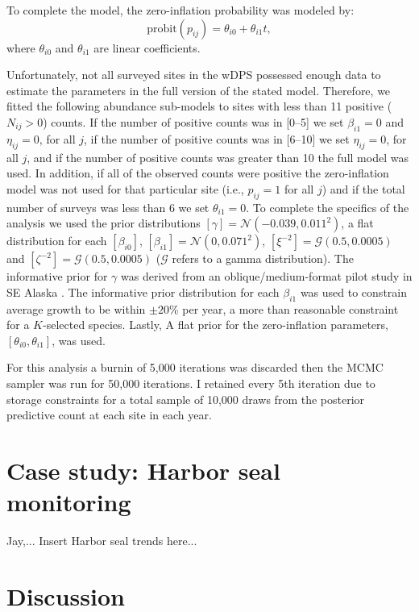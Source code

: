\documentclass[12pt,letter,draft]{article}
\newcommand{\Nij}{\ensuremath{N_{ij}}}
\begin{document}
To complete the model, the zero-inflation probability was modeled by:
\begin{equation}
\mbox{probit}(p_{ij}) = \theta_{i0} + \theta_{i1}t ,
\end{equation}
where $\theta_{i0}$ and $\theta_{i1}$ are linear coefficients. 

Unfortunately, not all surveyed sites in the wDPS possessed enough data to estimate the parameters in the full version of the stated model. Therefore, we fitted the following abundance sub-models to sites with less than 11 positive ($\Nij>0$) counts. If the number of positive counts was in [0--5] we set $\beta_{i1}=0$ and $\eta_{ij}=0$, for all $j$, if the number of positive counts was in [6--10] we set $\eta_{ij}=0$, for all $j$, and if the number of positive counts was greater than 10 the full model was used. In addition, if all of the observed counts were positive the zero-inflation model was not used for that particular site (i.e., $p_{ij}=1$ for all $j$) and if the total number of surveys was less than 6 we set $\theta_{i1}=0$. To complete the specifics of the analysis we used the prior distributions $[\gamma]=\mathcal{N}(-0.039, 0.011^2)$, a flat distribution for each $[\beta_{i0}]$, $[\beta_{i1}] = \mathcal{N}(0,0.071^2)$, $[\xi^{-2}]=\mathcal{G}(0.5,0.0005)$ and $[\zeta^{-2}]=\mathcal{G}(0.5,0.0005)$ ($\mathcal{G}$ refers to a gamma distribution). The informative prior for $\gamma$ was derived from an oblique/medium-format pilot study in SE Alaska \citep{}. The informative prior distribution for each $\beta_{i1}$ was used to constrain average growth to be within $\pm20$\% per year, a more than reasonable constraint for a $K$-selected species. Lastly, A flat prior for the zero-inflation parameters, $[\theta_{i0},\theta_{i1}]$, was used. 

For this analysis a burnin of 5,000 iterations was discarded then the MCMC sampler was run for 50,000 iterations. I retained every 5th iteration due to storage constraints for a total sample of 10,000 draws from the posterior predictive count at each site in each year. 




\section{Case study: Harbor seal monitoring}

Jay,... Insert Harbor seal trends here...




\section{Discussion}
\end{document}
